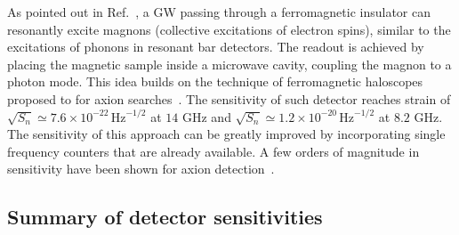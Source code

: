 \documentclass[11pt,a4paper]{article}
\begin{document}
As pointed out in Ref.~\cite{Ito:2019wcb}, a GW passing through a ferromagnetic insulator can resonantly excite magnons (collective excitations of electron spins), similar to the excitations of phonons in resonant bar detectors. The readout is achieved by placing the magnetic sample inside a microwave cavity, coupling the magnon to a photon mode. This idea builds on the technique of ferromagnetic haloscopes proposed to for axion searches~\cite{Crescini2018,Flower:2018qgb}.
%
The sensitivity of such detector reaches strain of $\sqrt{S_n} \simeq 7.6 \times 10^{-22} \, \text{Hz}^{-1/2}$ at $14$ GHz and $\sqrt{S_n} \simeq 1.2 \times 10^{-20} \, \text{Hz}^{-1/2}$ at $8.2$ GHz. The sensitivity of this approach can be greatly improved by incorporating single frequency counters that are already available. A few orders of magnitude in sensitivity have been shown for axion detection~\cite{PhysRevD.88.035020}.

\subsection{Summary of detector sensitivities}
\label{sec:SummarySensitivities}
\end{document}
